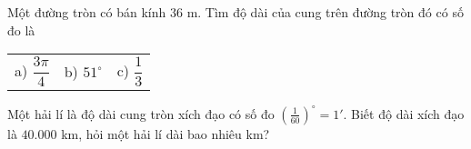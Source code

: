 \begin{vd}%
Một đường tròn có bán kính $36$ m. Tìm độ dài của cung trên đường tròn đó có số đo là\\
\begin{tabular}{lll}
a) $\dfrac{3\pi}{4}$ \qquad	\qquad \qquad&	b) $51^\circ$	\qquad\qquad	\qquad& c) $\dfrac{1}{3}$\\
\end{tabular}
\end{vd}

\begin{vd}%
Một hải lí là độ dài cung tròn xích đạo có số đo $\displaystyle \left( \frac{1}{60} \right)^\circ=1'$. Biết độ dài xích đạo là $40.000$ km, hỏi một hải lí dài bao nhiêu km?
\end{vd}

